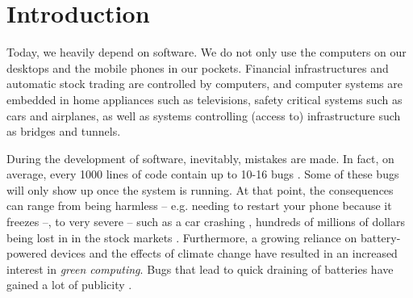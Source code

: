 \documentclass[sigplan]{acmart}\settopmatter{printfolios=true,printccs=false,printacmref=false}
\begin{document}




\maketitle

\section{Introduction}
Today, we heavily depend on software. We do not only use the computers on our
desktops and the mobile phones in our pockets. Financial infrastructures and
automatic stock trading are controlled by computers, and computer systems are
embedded in home appliances such as televisions, safety critical systems such as
cars and airplanes, as well as systems controlling (access to) infrastructure
such as bridges and tunnels.

During the development of software, inevitably, mistakes are made. In fact, on
average, every 1000 lines of code contain up to 10-16 bugs \cite{ostrand_distribution_2002,ostrand_where_2004}.
Some of these bugs will only show up once the system is running. At that
point, the consequences can range from being harmless -- e.g. needing to restart
your phone because it freezes --, to very severe -- such as a car crashing
\cite{ntsb_2018}, hundreds of millions of dollars being lost in in the stock markets
\cite{glitch_2012}. Furthermore, a growing reliance on battery-powered devices and the
effects of climate change have resulted in an increased interest in \emph{green
computing}. Bugs that lead to quick draining of batteries have gained a lot of
publicity \cite{facebook_bug_2017}.
\end{document}
